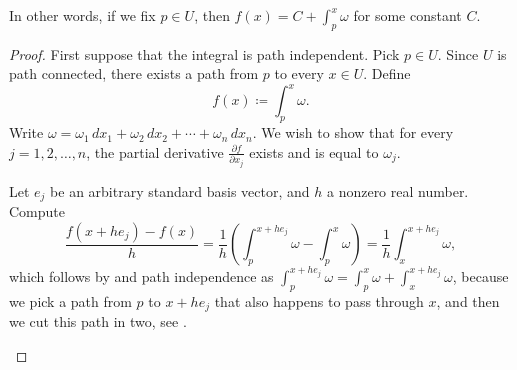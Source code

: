 In other words, if we fix $p \in U$, then $f(x) = C + \int_{p}^x \omega$
for some constant $C$.

\begin{proof}
First suppose that the integral is path independent.  Pick $p \in U$.  Since
$U$ is path connected, there exists a path from $p$ to every $x \in U$.
Define
\begin{equation*}
f(x) \coloneqq \int_{p}^x \omega .
\end{equation*}
Write $\omega = \omega_1 \,dx_1 + \omega_2 \,dx_2 + \cdots + \omega_n \,dx_n$.
We wish to show that for every $j = 1,2,\ldots,n$, the
partial derivative $\frac{\partial f}{\partial x_j}$ exists
and is equal to $\omega_j$.

Let $e_j$ be an arbitrary standard basis vector, and $h$ a nonzero real
number.  Compute
\begin{equation*}
\frac{f(x+h e_j) - f(x)}{h} =
\frac{1}{h} \left( \int_{p}^{x+he_j} \omega - \int_{p}^x \omega \right)
=
\frac{1}{h} \int_{x}^{x+he_j} \omega ,
\end{equation*}
which follows by  and path independence as 
$\int_{p}^{x+he_j} \omega =
\int_{p}^{x} \omega +
\int_{x}^{x+he_j} \omega$, because we pick a path from $p$ to
$x+he_j$ that also happens to pass through $x$, and then we cut this path in
two, see .

\begin{myfigureht}
\caption{Using path independence in computing the partial
derivative.\label{fig:pathindantider}}
\end{myfigureht}



\end{proof}
